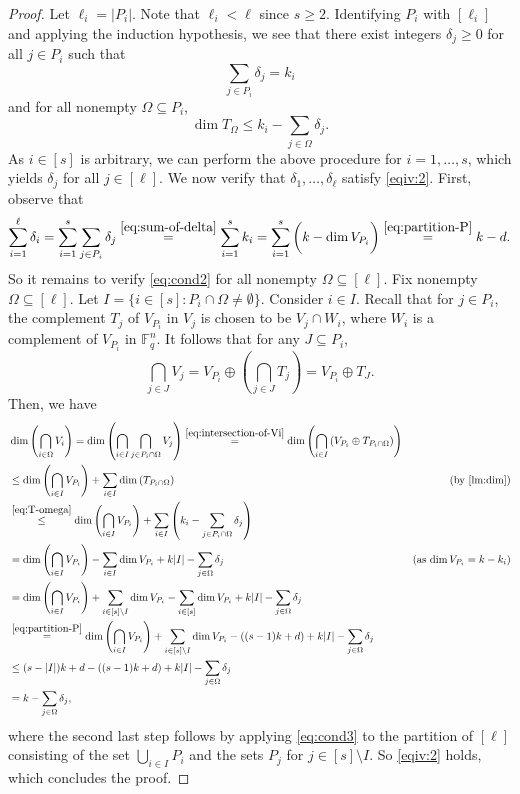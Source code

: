 \documentclass[10pt,a4paper]{amsart}
\newcommand{\F}{\mathbb{F}}
\begin{document}
\begin{proof}
Let $\ell_i=|P_i|$. Note that $\ell_i<\ell$ since $s\geq 2$.
Identifying $P_i$ with $[\ell_i]$ and applying the induction hypothesis, we see that there exist integers $\delta_j\geq 0$ for all $j\in P_i$ such that
\begin{equation}\label{eq:sum-of-delta}
\sum_{j\in P_i}\delta_j=k_i
\end{equation}
and for all nonempty $\Omega\subseteq P_i$,
\begin{equation}\label{eq:T-omega}
\dim T_{\Omega}\leq k_i-\sum_{j\in \Omega} \delta_j.
\end{equation}
As $i\in [s]$ is arbitrary, we can perform the above procedure for $i=1,\dots,s$, which yields $\delta_j$ for all $j\in [\ell]$.
We now verify that $\delta_1,\dots,\delta_{\ell}$ satisfy \cref{eqiv:2}. First, observe that
\[
\sum_{i=1}^\ell \delta_i
=\sum_{i=1}^s\sum_{j\in P_i}\delta_j
\stackrel{\eqref{eq:sum-of-delta}}{=}\sum_{i=1}^s k_i
=\sum_{i=1}^s \bigg(k-\dim V_{P_i}\bigg)\stackrel{\eqref{eq:partition-P}}{=}k-d.
\]
So it remains to verify \eqref{eq:cond2} for all nonempty $\Omega\subseteq [\ell]$. 
Fix nonempty $\Omega\subseteq [\ell]$. Let $I=\{i\in [s]: P_i\cap \Omega \neq \emptyset\}$.
Consider $i\in I$. Recall that for $j\in P_i$, the complement $T_j$ of $V_{P_i}$ in $V_j$ is chosen to be $V_j\cap W_i$, where $W_i$ is a complement of $V_{P_i}$ in $\F_q^n$. It follows that for any $J\subseteq P_i$,
\begin{equation}\label{eq:intersection-of-Vi}
\bigcap_{j\in J} V_j=V_{P_i}\oplus \left(\bigcap_{j\in J} T_j\right)=V_{P_i}\oplus T_{J}.
\end{equation}
Then, we have
\begin{align*}
&\dim\left(\bigcap_{i\in \Omega}V_i\right)
=\dim\left(\bigcap_{i\in I}\bigcap_{j\in P_i\cap \Omega} V_j\right)
\stackrel{\eqref{eq:intersection-of-Vi}}{=}\dim\left(\bigcap_{i\in I}\left(V_{P_i}\oplus T_{P_i\cap\Omega}\right)\right)\\
&\leq\dim\left(\bigcap_{i\in I}V_{P_i}\right)+\sum_{i\in I}\dim\left(T_{P_i\cap\Omega}\right) & \text{(by \cref{lm:dim})}\\
&\stackrel{\eqref{eq:T-omega}}{\leq} \dim\left(\bigcap_{i\in I}V_{P_i}\right)+\sum_{i\in I}\left(k_i-\sum_{j\in P_i\cap\Omega} \delta_j\right)\\
&=\dim\left(\bigcap_{i\in I}V_{P_i}\right)-\sum_{i\in I} \dim V_{P_i}+k|I|-\sum_{j\in \Omega}\delta_j & \text{(as  $\dim V_{P_i}=k-k_i$)}\\
&=\dim\left(\bigcap_{i\in I}V_{P_i}\right)+\sum_{i\in [s]\setminus I}\dim V_{P_i}-\sum_{i\in [s]}\dim V_{P_i}+k|I|-\sum_{j\in \Omega}\delta_j\\
&\stackrel{\eqref{eq:partition-P}}{=}\dim\left(\bigcap_{i\in I}V_{P_i}\right)+\sum_{i\in [s]\setminus I}\dim V_{P_i}-((s-1)k+d)+k|I|-\sum_{j\in \Omega}\delta_j\\
& \leq (s-|I|)k+d-((s-1)k+d)+k|I|-\sum_{j\in \Omega}\delta_j\\ &=k-\sum_{j\in \Omega}\delta_j,
\end{align*}
where the second last step follows by applying \eqref{eq:cond3} to the partition of $[\ell]$ consisting of the set $\bigcup_{i\in I}P_i$ and the sets $P_j$ for $j\in [s]\setminus I$. So \cref{eqiv:2} holds, which concludes the proof.
\end{proof}
\end{document}
